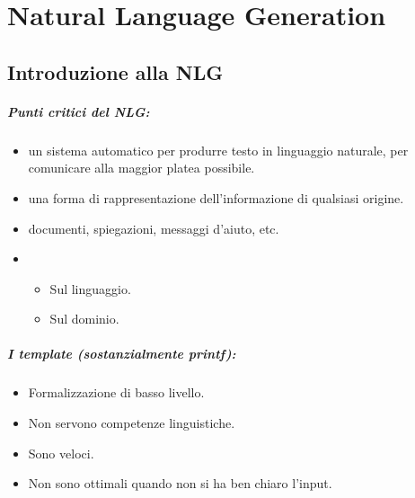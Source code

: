 \chapter{Natural Language Generation}

\section{Introduzione alla NLG}




\paragraph{Punti critici del NLG:}

\begin{itemize}
  \item {} un sistema automatico per produrre testo in linguaggio naturale, per comunicare alla maggior platea possibile. 
  \item {} una forma di rappresentazione dell'informazione di qualsiasi origine. 
  \item {} documenti, spiegazioni, messaggi d'aiuto, etc. 
  \item {} 
    \begin{itemize}
      \item Sul linguaggio. 
      \item Sul dominio.
    \end{itemize}
\end{itemize}


\paragraph{I template (sostanzialmente printf):}

\begin{itemize}
  \item Formalizzazione di basso livello. 
  \item Non servono competenze linguistiche. 
  \item Sono veloci. 
  \item Non sono ottimali quando non si ha ben chiaro l'input.
\end{itemize}

